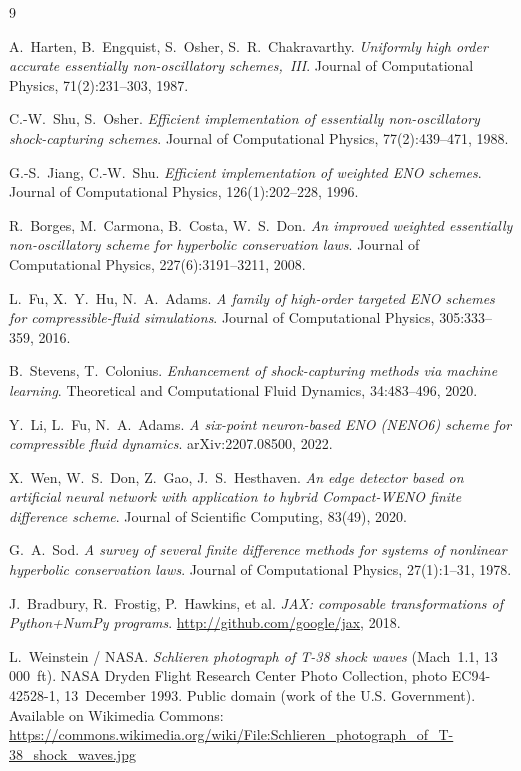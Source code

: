 \documentclass[12pt,a4paper,oneside]{report}
\begin{document}
\begin{thebibliography}{9}

A.~Harten, B.~Engquist, S.~Osher, S.~R.~Chakravarthy.
\emph{Uniformly high order accurate essentially non-oscillatory schemes,~III}.
Journal of Computational Physics, 71(2):231--303, 1987.

C.-W.~Shu, S.~Osher.
\emph{Efficient implementation of essentially non-oscillatory shock-capturing
schemes}.
Journal of Computational Physics, 77(2):439--471, 1988.

G.-S.~Jiang, C.-W.~Shu.
\emph{Efficient implementation of weighted ENO schemes}.
Journal of Computational Physics, 126(1):202--228, 1996.

R.~Borges, M.~Carmona, B.~Costa, W.~S.~Don.
\emph{An improved weighted essentially non-oscillatory scheme for hyperbolic
conservation laws}.
Journal of Computational Physics, 227(6):3191--3211, 2008.

L.~Fu, X.~Y.~Hu, N.~A.~Adams.
\emph{A family of high-order targeted ENO schemes for compressible-fluid
simulations}.
Journal of Computational Physics, 305:333--359, 2016.

B.~Stevens, T.~Colonius.
\emph{Enhancement of shock-capturing methods via machine learning}.
Theoretical and Computational Fluid Dynamics, 34:483--496, 2020.

Y.~Li, L.~Fu, N.~A.~Adams.
\emph{A six-point neuron-based ENO (NENO6) scheme for compressible fluid
dynamics}.
arXiv:2207.08500, 2022.

X.~Wen, W.~S.~Don, Z.~Gao, J.~S.~Hesthaven.
\emph{An edge detector based on artificial neural network with application to
hybrid Compact-WENO finite difference scheme}.
Journal of Scientific Computing, 83(49), 2020.

G.~A.~Sod.
\emph{A survey of several finite difference methods for systems of nonlinear
hyperbolic conservation laws}.
Journal of Computational Physics, 27(1):1--31, 1978.

J.~Bradbury, R.~Frostig, P.~Hawkins, et al.
\emph{JAX: composable transformations of Python+NumPy programs}.
\url{http://github.com/google/jax}, 2018.

L.~Weinstein / NASA.
\emph{Schlieren photograph of T-38 shock waves} (Mach~1.1, 13\,000~ft).
NASA Dryden Flight Research Center Photo Collection, photo EC94-42528-1,
13~December 1993. Public domain (work of the U.S. Government).
Available on Wikimedia Commons:
\url{https://commons.wikimedia.org/wiki/File:Schlieren_photograph_of_T-38_shock_waves.jpg}

\end{thebibliography}
\end{document}
